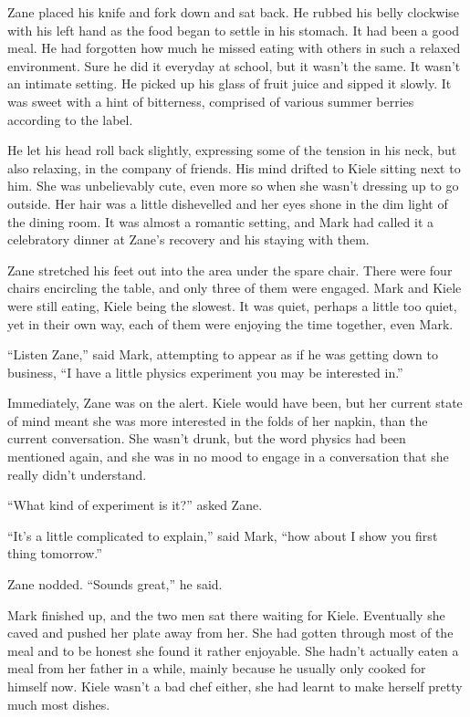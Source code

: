 Zane placed his knife and fork down and sat back.  He rubbed his belly clockwise with his left hand as the food began to settle in his stomach.  It had been a good meal.  He had forgotten how much he missed eating with others in such a relaxed environment.  Sure he did it everyday at school, but it wasn't the same.  It wasn't an intimate setting.  He picked up his glass of fruit juice and sipped it slowly.  It was sweet with a hint of bitterness, comprised of various summer berries according to the label.

He let his head roll back slightly, expressing some of the tension in his neck, but also relaxing, in the company of friends.  His mind drifted to Kiele sitting next to him.  She was unbelievably cute, even more so when she wasn't dressing up to go outside.  Her hair was a little dishevelled and her eyes shone in the dim light of the dining room.  It was almost a romantic setting, and Mark had called it a celebratory dinner at Zane's recovery and his staying with them.

Zane stretched his feet out into the area under the spare chair.  There were four chairs encircling the table, and only three of them were engaged.  Mark and Kiele were still eating, Kiele being the slowest.  It was quiet, perhaps a little too quiet, yet in their own way, each of them were enjoying the time together, even Mark.

``Listen Zane,'' said Mark, attempting to appear as if he was getting down to business, ``I have a little physics experiment you may be interested in.''

Immediately, Zane was on the alert.  Kiele would have been, but her current state of mind meant she was more interested in the folds of her napkin, than the current conversation.  She wasn't drunk, but the word physics had been mentioned again, and she was in no mood to engage in a conversation that she really didn't understand.

``What kind of experiment is it?'' asked Zane.

``It's a little complicated to explain,'' said Mark, ``how about I show you first thing tomorrow.''

Zane nodded.  ``Sounds great,'' he said.

Mark finished up, and the two men sat there waiting for Kiele.  Eventually she caved and pushed her plate away from her.  She had gotten through most of the meal and to be honest she found it rather enjoyable.  She hadn't actually eaten a meal from her father in a while, mainly because he usually only cooked for himself now.  Kiele wasn't a bad chef either, she had learnt to make herself pretty much most dishes.

